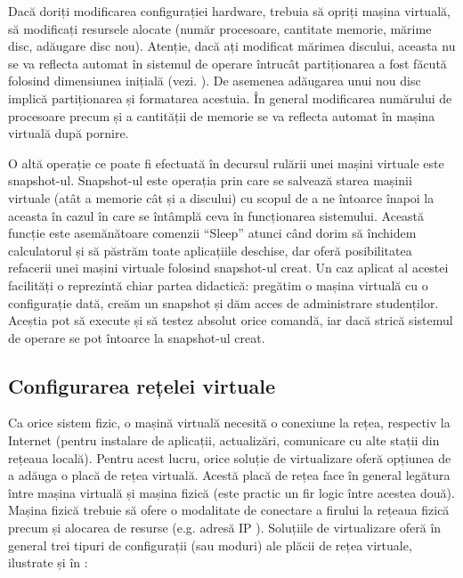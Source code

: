 Dacă doriți modificarea configurației hardware, trebuia să opriți mașina
virtuală, să modificați resursele alocate (număr procesoare, cantitate memorie,
mărime disc, adăugare disc nou). Atenție, dacă ați modificat mărimea discului,
aceasta nu se va reflecta automat în sistemul de operare întrucât partiționarea
a fost făcută folosind dimensiunea inițială (vezi.
). De asemenea adăugarea unui nou disc
implică partiționarea și formatarea acestuia. În general modificarea numărului
de procesoare precum și a cantității de memorie se va reflecta automat în mașina
virtuală după pornire.

O altă operație ce poate fi efectuată în decursul rulării unei mașini virtuale
este snapshot-ul. Snapshot-ul este operația prin care se salvează starea mașinii
virtuale (atât a memorie cât și a discului) cu scopul de a ne întoarce înapoi la
aceasta în cazul în care se întâmplă ceva în funcționarea sistemului. Această
funcție este asemănătoare comenzii “Sleep” atunci când dorim să închidem
calculatorul și să păstrăm toate aplicațiile deschise, dar oferă posibilitatea
refacerii unei mașini virtuale folosind snapshot-ul creat. Un caz aplicat al
acestei facilități o reprezintă chiar partea didactică: pregătim o mașina
virtuală cu o configurație dată, creăm un snapshot și dăm acces de administrare
studenților. Aceștia pot să execute și să testez absolut orice comandă, iar dacă
strică sistemul de operare se pot întoarce la snapshot-ul creat.

\subsection{Configurarea rețelei virtuale}
\label{sec:vm-ops-config}

Ca orice sistem fizic, o mașină virtuală necesită o conexiune la rețea,
respectiv la Internet (pentru instalare de aplicații, actualizări, comunicare cu
alte stații din rețeaua locală). Pentru acest lucru, orice soluție de
virtualizare oferă opțiunea de a adăuga o placă de rețea virtuală. Acestă placă
de rețea face în general legătura între mașina virtuală și mașina fizică (este
practic un fir logic între acestea două). Mașina fizică trebuie să ofere o
modalitate de conectare a firului la rețeaua fizică precum și alocarea de
resurse (e.g. adresă IP ). Soluțiile de
virtualizare oferă în general trei tipuri de configurații (sau moduri) ale
plăcii de rețea virtuale, ilustrate și în :

